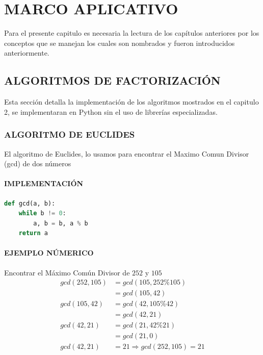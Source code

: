 \clearpage
\chapter{MARCO APLICATIVO}
Para el presente capitulo es necesaria la lectura de los capítulos anteriores por los conceptos que se manejan los cuales son nombrados y fueron introducidos anteriormente.
\section{ALGORITMOS DE FACTORIZACIÓN}
Esta sección detalla la implementación de los algoritmos mostrados en el capitulo 2, se implementaran en Python sin el uso de librerías especializadas.
\subsection{ALGORITMO DE EUCLIDES}
El algoritmo de Euclides, lo usamos para encontrar el Maximo Comun Divisor (gcd) de dos números
    \subsubsection{IMPLEMENTACIÓN}
\begin{lstlisting}[language=Python]
def gcd(a, b):
    while b != 0:
        a, b = b, a % b
    return a
\end{lstlisting}
    \subsubsection{EJEMPLO NÚMERICO}
    Encontrar el Máximo Común Divisor de $252$ y $105$
    \begin{align*} 
        gcd(252, 105) &=  gcd(105, 252\%105) \\ 
        &=  gcd(105, 42) \\
        gcd(105, 42) &=  gcd(42, 105\%42) \\ 
        &=  gcd(42, 21) \\
        gcd(42, 21) &=  gcd(21, 42\%21) \\ 
        &=  gcd(21, 0) \\
        gcd(42, 21) &= 21 \Rightarrow gcd(252, 105) = 21\\
    \end{align*}

